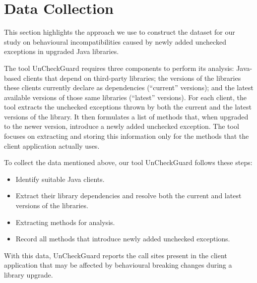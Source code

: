 \chapter{Data Collection}

This section highlights the approach we use to construct the dataset for our study on behavioural incompatibilities caused by newly added unchecked exceptions in upgraded Java libraries.


The tool UnCheckGuard requires three components to perform its analysis: Java-based clients that depend on third-party libraries; the versions of the libraries these clients currently declare as dependencies (“current” versions); and the latest available versions of those same libraries (“latest” versions). For each client, the tool extracts the unchecked exceptions thrown by both the current and the latest versions of the library. It then formulates a list of methods that, when upgraded to the newer version, introduce a newly added unchecked exception. The tool focuses on extracting and storing this information only for the methods that the client application actually uses.


To collect the data mentioned above, our tool UnCheckGuard follows these steps:
\begin{itemize}
    \item Identify suitable Java clients.
    \item Extract their library dependencies and resolve both the current and latest versions of the libraries.
    \item Extracting methods for analysis.
    \item Record all methods that introduce newly added unchecked exceptions.
\end{itemize}
With this data, UnCheckGuard reports the call sites present in the client application that may be affected by behavioural breaking changes during a library upgrade.

